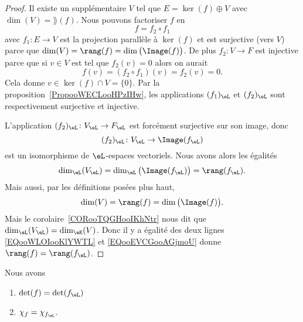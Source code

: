 \begin{proof}
    Il existe un supplémentaire \( V\) tel que \( E=\ker(f)\oplus V\) avec \( \dim(V)=\rang(f)\). Nous pouvons factoriser \( f\) en
    \begin{equation}
        f=f_2\circ f_1
    \end{equation}
    avec \( f_1\colon E\to V\) est la projection parallèle à \( \ker(f)\) et est surjective (vers \( V\)) parce que \( \dim(V)=\rang(f)=\dim\big( \Image(f) \big)\). De plus \( f_2\colon V\to F\) est injective parce que si \( v\in V\) est tel que \( f_2(v)=0\) alors on aurait
    \begin{equation}
        f(v)=(f_2\circ f_1)(v)=f_2(v)=0.
    \end{equation}
    Cela donne \( v\in\ker(f)\cap V=\{ 0 \}\). Par la proposition~\ref{PropooWECLooHPzIHw}, les applications \( (f_1)_{\eL}\) et \( (f_2)_{\eL}\) sont respectivement surjective et injective.

    L'application \( (f_2)_{\eL}\colon V_{\eL}\to F_{\eL}\) est forcément surjective sur son image, donc
    \begin{equation}
        (f_2)_{\eL}\colon V_{\eL}\to \Image(f_{\eL})
    \end{equation}
    est un isomorphisme de \( \eL\)-espaces vectoriels. Nous avons alors les égalités
    \begin{equation}        \label{EQooWLOIooKlYWTL}
        \dim_{\eL}(V_{\eL})=\dim_{\eL}\big( \Image(f_{\eL}) \big)=\rang(f_{\eL}).
    \end{equation}
    Mais aussi, par les définitions posées plus haut,
    \begin{equation}        \label{EQooEVCGooAGjmoU}
        \dim(V)=\rang(f)=\dim\big( \Image(f) \big).
    \end{equation}
    Mais le corolaire~\ref{CORooTQGHooIKhNtr} nous dit que \( \dim_{\eL}(V_{\eL})=\dim_{\eK}(V)\). Donc il y a égalité des deux lignes \eqref{EQooWLOIooKlYWTL} et \eqref{EQooEVCGooAGjmoU} donne \( \rang(f)=\rang(f_{\eL})\).
\end{proof}

\begin{proposition}     \label{PROPooZAZFooUFdCUv}
    Nous avons
    \begin{enumerate}
        \item
            \( \det(f)=\det(f_{\eL})\)
        \item
            \( \chi_f=\chi_{f_{\eL}}\).
    \end{enumerate}
\end{proposition}

